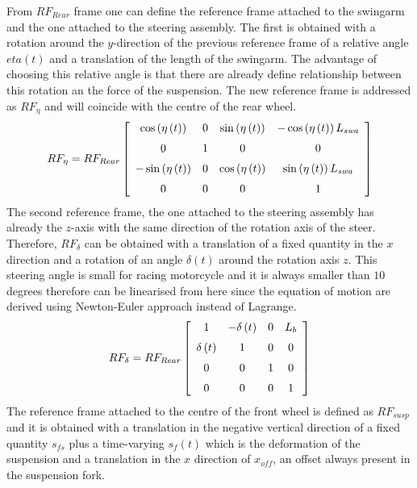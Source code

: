%
From $RF_{Rear}$ frame one can define the reference frame attached to the swingarm and the one attached to the steering assembly. The first is obtained with a rotation around the $y$-direction of the previous reference frame of a relative angle $eta(t)$ and a translation of the length of the swingarm. The advantage of choosing this relative angle is that there are already define relationship between this rotation an the force of the suspension. The new reference frame is addressed as $RF_\eta$ and will coincide with the centre of the rear wheel.
%
\begin{equation}
    RF_{\eta} = RF_{Rear} 
    \left[ \begin {array}{cccc} \cos \left( \eta \left( t \right) 
    \right) &0&\sin \left( \eta \left( t \right)  \right) &-\cos \left( 
    \eta \left( t \right)  \right) L_{{\it swa}}\\ \noalign{\medskip}0&1&0
    &0\\ \noalign{\medskip}-\sin \left( \eta \left( t \right)  \right) &0&
    \cos \left( \eta \left( t \right)  \right) &\sin \left( \eta \left( t
    \right)  \right) L_{{\it swa}}\\ \noalign{\medskip}0&0&0&1
    \end {array} \right]
\end{equation}
%
The second reference frame, the one attached to the steering assembly has already the $z$-axis with the same direction of the rotation axis of the steer. Therefore, $RF_\delta$ can be obtained with a translation of a fixed quantity in the $x$ direction and a rotation of an angle $\delta(t)$ around the rotation axis $z$. This steering angle is small for racing motorcycle and it is always smaller than $10$ degrees therefore can be linearised from here since the equation of motion are derived using Newton-Euler approach instead of Lagrange.
%
\begin{equation}
    RF_{\delta} = RF_{Rear} 
    \left[ \begin {array}{cccc} 1&-\delta \left( t \right) &0&L_{b}
    \\ \noalign{\medskip}\delta \left( t \right) &1&0&0
    \\ \noalign{\medskip}0&0&1&0\\ \noalign{\medskip}0&0&0&1\end {array}
     \right]    
\end{equation}
%
The reference frame attached to the centre of the front wheel is defined as $RF_{susp}$ and it is obtained with a translation in the negative vertical direction of a fixed quantity $s_{fs}$ plus a time-varying $s_f(t)$ which is the deformation of the suspension and a translation in the $x$ direction of $x_{off}$, an offset always present in the suspension fork.
